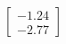 \documentclass[preview]{standalone}
\begin{document}
\begin{align*}
\begin{bmatrix} -1.24 \\ -2.77 \end{bmatrix}
\end{align*}
\end{document}

